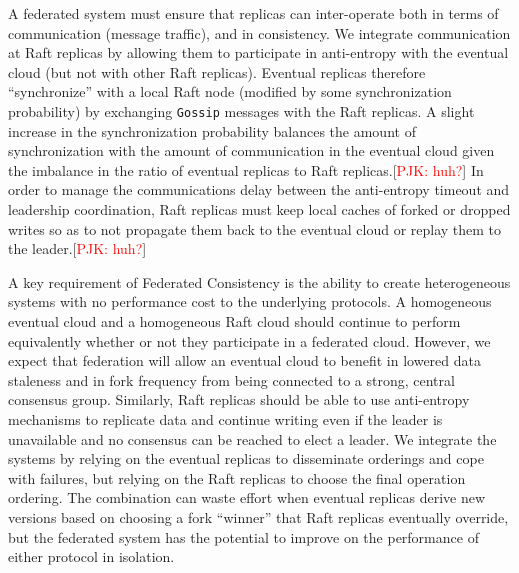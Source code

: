 \documentclass[10pt,conference,letterpaper]{IEEEtran}
\newcommand{\todo}[1]{{\textcolor{red}{#1}}}
\newcommand{\pjk}[1]{[\todo{PJK: #1}]}
\newcommand{\note}[1]{\textcolor{blue}{[#1]}}
\begin{document}

A federated system must ensure that replicas can inter-operate both in terms of
communication (message traffic), and in consistency.
We integrate communication at Raft replicas by allowing them to participate in anti-entropy
with the eventual cloud (but not with other Raft replicas).
Eventual replicas therefore ``synchronize'' with a local Raft node (modified by some
synchronization probability) by exchanging \texttt{Gossip} messages with the Raft replicas.
A slight increase in the synchronization probability balances the amount of
synchronization with the amount of communication in the eventual cloud given the imbalance
in the ratio of eventual replicas to Raft replicas.\pjk{huh?}
In order to manage the communications delay between the anti-entropy timeout and
leadership coordination, Raft replicas must keep local caches of forked or dropped writes so
as to not propagate them back to the eventual cloud or replay them to the leader.\pjk{huh?}

A key requirement of Federated Consistency is the ability to create heterogeneous systems
with no performance cost to the underlying protocols.
A homogeneous eventual cloud and a homogeneous Raft cloud should continue to perform
equivalently whether or not they participate in a federated cloud.
However, we expect that federation will allow an eventual cloud to benefit in lowered data
staleness and in fork frequency from being connected to a strong, central consensus group.
Similarly, Raft replicas should be able to use anti-entropy mechanisms to replicate data
and continue writing even if the leader is unavailable and no consensus can be reached to
elect a leader.
We integrate the systems by relying on the eventual replicas to disseminate orderings and
cope with failures, but relying on the Raft replicas to choose the final operation
ordering.
The combination can waste effort when eventual replicas derive new versions based on
choosing a fork ``winner'' that Raft replicas eventually override, but the federated
system has the potential to improve on the performance of either protocol in isolation.
\end{document}
